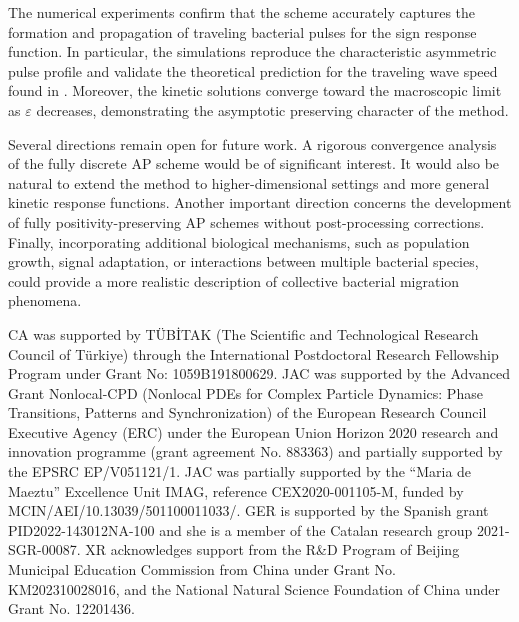 \documentclass[11pt,twoside]{article}
\numberwithin{equation}{section}
\theoremstyle{plain}
\theoremstyle{nonumberplain}
\begin{document}
{The numerical experiments confirm that the scheme accurately captures the formation and propagation of traveling bacterial pulses for the sign response function. In particular, the simulations reproduce the characteristic asymmetric pulse profile and validate the theoretical prediction for the traveling wave speed found in \cite{calvez2019chemotactic}. Moreover, the kinetic solutions converge toward the macroscopic limit as $\varepsilon$ decreases, demonstrating the asymptotic preserving character of the method.

Several directions remain open for future work. A rigorous convergence analysis of the fully discrete AP scheme would be of significant interest. It would also be natural to extend the method to higher-dimensional settings and more general kinetic response functions. Another important direction concerns the development of fully positivity-preserving AP schemes without post-processing corrections. Finally, incorporating additional biological mechanisms, such as population growth, signal adaptation, or interactions between multiple bacterial species, could provide a more realistic description of collective bacterial migration phenomena.



\bigskip
{} 
CA was supported by TÜBİTAK (The Scientific and Technological Research Council of Türkiye) through the International Postdoctoral Research Fellowship Program under Grant No: 1059B191800629.
JAC was supported by the Advanced Grant Nonlocal-CPD (Nonlocal PDEs for Complex Particle Dynamics: Phase Transitions, Patterns and Synchronization) of the European Research Council Executive Agency (ERC) under the European Union Horizon 2020 research and innovation programme (grant agreement No. 883363) and  partially supported by the EPSRC EP/V051121/1. JAC was partially supported by the ``Maria de Maeztu'' Excellence Unit IMAG, reference CEX2020-001105-M, funded by MCIN/AEI/10.13039/501100011033/.
GER is supported by the Spanish grant PID2022-143012NA-100 and she is a member of the Catalan research group 2021-SGR-00087.
XR acknowledges support from the R\&D Program of Beijing Municipal Education Commission from China under Grant No.  KM202310028016, and the National Natural Science Foundation of China under Grant No. 12201436. 



\appendix


}
\end{document}
